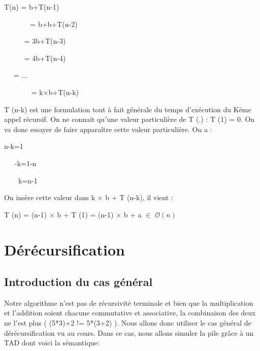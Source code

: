 \documentclass[a4paper, 11pt, oneside]{article}
\begin{document}
\begin{center}
T(n) = b+T(n-1)
    
\textcolor{white}{----------} = b+b+T(n-2) 
    
\textcolor{white}{--------} = 3b+T(n-3) 

\textcolor{white}{--------} = 4b+T(n-4) 

\textcolor{white}{---} = ...\textcolor{white}{-------}
    
\textcolor{white}{-----------} = k$\times$b+T(n-k)

\end{center}

T (n-k) est une formulation tout à fait générale du temps d’exécution du Kème
appel récursif. On ne connait qu$'$une valeur particulière de T (.) : T (1) = 0.
On va donc essayer de faire apparaître cette valeur particulière. On a :

\begin{center}
n-k=1
    
\textcolor{white}{-----}-k=1-n    
    
\textcolor{white}{------}k=n-1
\end{center}

On insère cette valeur dans k $\times$ b + T (n-k), il vient :

\begin{center}
T (n) = (n-1) $\times$ b + T (1) = (n-1) $\times$ b + a $\in$
$\mathcal{O}(n)$
\end{center}



\section{Dérécursification}\label{derecur}


\subsection{Introduction du cas général}


Notre algorithme n'est pas de récursivité terminale et bien que la multiplication 
et l$'$addition soient chacune commutative et associative, la combinaison des 
deux ne l$'$est plus ( (5*3)+2 != 5*(3+2) ). Nous allons donc utiliser le cas
général de dérécursification vu au cours. Dans ce cas, nous allons simuler la pile
grâce à un TAD dont voici la sémantique:\vspace{0.5cm}
\end{document}
